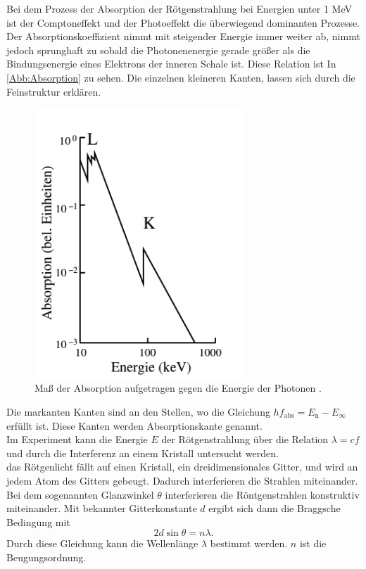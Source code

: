 Bei dem Prozess der Absorption der Rötgenstrahlung bei Energien unter
1 MeV ist der Comptoneffekt und der Photoeffekt die überwiegend dominanten
Prozesse.\\
Der Absorptionskoeffizient nimmt mit steigender Energie immer weiter ab,
nimmt jedoch sprunghaft zu sobald die Photonenenergie gerade größer als die
Bindungsenergie eines Elektrons der inneren Schale ist. Diese Relation ist In
\autoref{Abb:Absorption} zu sehen. Die einzelnen kleineren Kanten, lassen
sich durch die Feinstruktur erklären.\\
\begin{figure}
    \centering
    \includegraphics[width=0.7\textwidth]{Bilder/Absorption.png}
    \caption{Maß der Absorption aufgetragen gegen die Energie der Photonen \cite{sample}.}
    \label{Abb:Absorption}
\end{figure}
Die markanten Kanten sind an den Stellen, wo die Gleichung $h f_{\mathrm{abs}} = E_{\mathrm{n}} - E_{\infty}$
erfüllt ist. Diese Kanten werden Absorptionskante genannt.\\
Im Experiment kann die Energie $E$ der Rötgenstrahlung über die Relation $\lambda = cf$ und
durch die Interferenz an einem Kristall untersucht werden.\\
das Rötgenlicht fällt auf einen Kristall, ein dreidimensionales Gitter,
und wird an jedem Atom des Gitters gebeugt. Dadurch interferieren die 
Strahlen miteinander.\\
Bei dem sogenannten Glanzwinkel $\theta$ interferieren die Röntgenstrahlen konstruktiv
miteinander. Mit bekannter Gitterkonstante $d$ ergibt sich dann die Braggsche Bedingung mit
\begin{equation}
    2d \sin{\theta} = n \lambda.
\end{equation}
Durch diese Gleichung kann die Wellenlänge $\lambda$ bestimmt werden. $n$ ist 
die Beugungsordnung.\\

